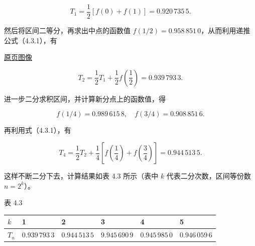 \documentclass[
  10pt,
  fontset=fandol]{ctexart}
\newcounter{none} %
\begin{document}
\[
T_1=\frac12[f(0)+f(1)]=0.920\,735\,5.
\]

然后将区间二等分，再求出中点的函数值 \(f(1/2)=0.958\,851\,0\)，从而利用递推公式（4.3.1），有

\href{../../source-images/pdf-102.jpeg}{原页图像}

\[
T_2=\frac12T_1+\frac12f\left(\frac12\right)=0.939\,793\,3.
\]

进一步二分求积区间，并计算新分点上的函数值，得

\[
f(1/4)=0.989\,615\,8,\quad f(3/4)=0.908\,851\,6.
\]

再利用式（4.3.1），有

\[
T_4=\frac12T_2+\frac14\left[f\left(\frac14\right)+f\left(\frac34\right)\right]=0.944\,513\,5.
\]

这样不断二分下去，计算结果如表 4.3 所示（表中 \(k\) 代表二分次数，区间等份数 \(n=2^k\)）。

表 4.3

{\def\LTcaptype{none} %
\begin{longtable}[]{@{}
  >{\raggedright\arraybackslash}p{}
  >{\raggedright\arraybackslash}p{}
  >{\raggedright\arraybackslash}p{}
  >{\raggedright\arraybackslash}p{}
  >{\raggedright\arraybackslash}p{}
  >{\raggedright\arraybackslash}p{}@{}}
\toprule\noalign{}
\begin{minipage}[b]{\linewidth}\raggedright
\(k\)
\end{minipage} & \begin{minipage}[b]{\linewidth}\raggedright
1
\end{minipage} & \begin{minipage}[b]{\linewidth}\raggedright
2
\end{minipage} & \begin{minipage}[b]{\linewidth}\raggedright
3
\end{minipage} & \begin{minipage}[b]{\linewidth}\raggedright
4
\end{minipage} & \begin{minipage}[b]{\linewidth}\raggedright
5
\end{minipage} \\
\midrule\noalign{}
\endhead
\bottomrule\noalign{}
\endlastfoot
\(T_n\) & \(0.939\,793\,3\) & \(0.944\,513\,5\) & \(9.945\,690\,9\) & \(0.945\,985\,0\) & \(0.946\,059\,6\) \\
\end{longtable}
}
\end{document}
